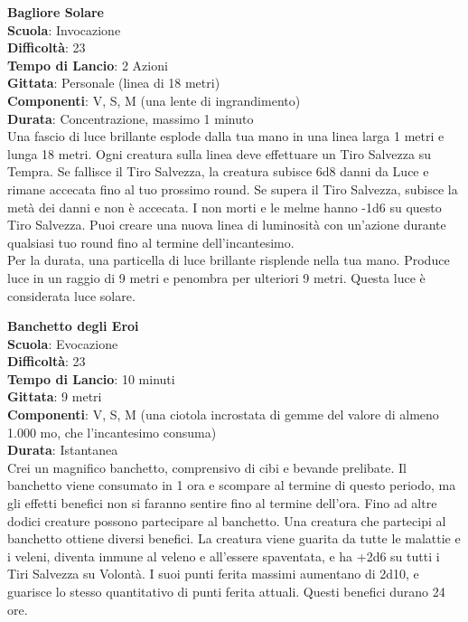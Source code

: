 \begin{multicols}{2}
\medskip\textbf{Bagliore Solare}\\
\textbf{Scuola}: Invocazione\\
\textbf{Difficoltà}: 23\\
\textbf{Tempo di Lancio}: 2 Azioni\\
\textbf{Gittata}: Personale (linea di 18 metri)\\
\textbf{Componenti}: V, S, M (una lente di ingrandimento)\\
\textbf{Durata}: Concentrazione, massimo 1 minuto\\
Una fascio di luce brillante esplode dalla tua mano in una linea larga 1 metri e lunga 18 metri. Ogni creatura sulla linea deve effettuare un Tiro Salvezza su Tempra. Se fallisce il Tiro Salvezza, la creatura subisce 6d8 danni da Luce e rimane accecata fino al tuo prossimo round. Se supera il Tiro Salvezza, subisce la metà dei danni e non è accecata. I non morti e le melme hanno -1d6 su questo Tiro Salvezza. Puoi creare una nuova linea di luminosità con un'azione durante qualsiasi tuo round fino al termine dell'incantesimo.\\
Per la durata, una particella di luce brillante risplende nella tua mano. Produce luce in un raggio di 9 metri e penombra per ulteriori 9 metri. Questa luce è considerata luce solare.

\medskip\textbf{Banchetto degli Eroi}\\
\textbf{Scuola}: Evocazione\\
\textbf{Difficoltà}: 23\\
\textbf{Tempo di Lancio}: 10 minuti\\
\textbf{Gittata}: 9 metri\\
\textbf{Componenti}: V, S, M (una ciotola incrostata di gemme del valore di almeno 1.000 mo, che l'incantesimo consuma)\\
\textbf{Durata}: Istantanea\\
Crei un magnifico banchetto, comprensivo di cibi e bevande prelibate. Il banchetto viene consumato in 1 ora e scompare al termine di questo periodo, ma gli effetti benefici non si faranno sentire fino al termine dell'ora. Fino ad altre dodici creature possono
partecipare al banchetto. Una creatura che partecipi al banchetto ottiene diversi benefici. La creatura viene guarita da tutte le malattie e i veleni, diventa immune al veleno e all'essere
spaventata, e ha +2d6 su tutti i Tiri Salvezza su Volontà. I suoi punti ferita massimi aumentano di 2d10, e guarisce lo stesso quantitativo di punti ferita attuali. Questi benefici durano 24 ore. 


\end{multicols}
